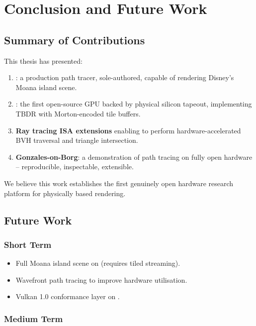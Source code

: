 \chapter{Conclusion and Future Work}
\label{chap:conclusion}

\section{Summary of Contributions}

This thesis has presented:

\begin{enumerate}
  \item \textbf{\gonzales{}}: a production path tracer, sole-authored,
    capable of rendering Disney's Moana island scene.
  \item \textbf{\borg{}}: the first open-source GPU backed by physical
    silicon tapeout, implementing TBDR with Morton-encoded tile buffers.
  \item \textbf{Ray tracing ISA extensions} enabling \borg{} to
    perform hardware-accelerated BVH traversal and triangle intersection.
  \item \textbf{Gonzales-on-Borg}: a demonstration of path tracing
    on fully open hardware -- reproducible, inspectable, extensible.
\end{enumerate}

We believe this work establishes the first genuinely open hardware
research platform for physically based rendering.

\section{Future Work}

\subsection{Short Term}

\begin{itemize}
  \item Full Moana island scene on \borg{} (requires tiled streaming).
  \item Wavefront path tracing to improve hardware utilisation.
  \item Vulkan 1.0 conformance layer on \borg{}.
\end{itemize}

\subsection{Medium Term}

